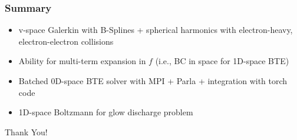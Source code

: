 \documentclass[mathserif, aspectratio=169]{beamer}
\begin{document}


\begin{frame}
	\frametitle{Summary}
	\begin{itemize}
		\item v-space Galerkin with B-Splines + spherical harmonics with electron-heavy, electron-electron collisions
		\item Ability for multi-term expansion in $f$ (i.e., BC in space for 1D-space BTE)
		\item Batched 0D-space BTE solver with MPI + Parla + integration with torch code
		\item 1D-space Boltzmann for glow discharge problem
	\end{itemize}
	\pause
	\begin{center}
		Thank You!
	\end{center}
\end{frame}
\end{document}
